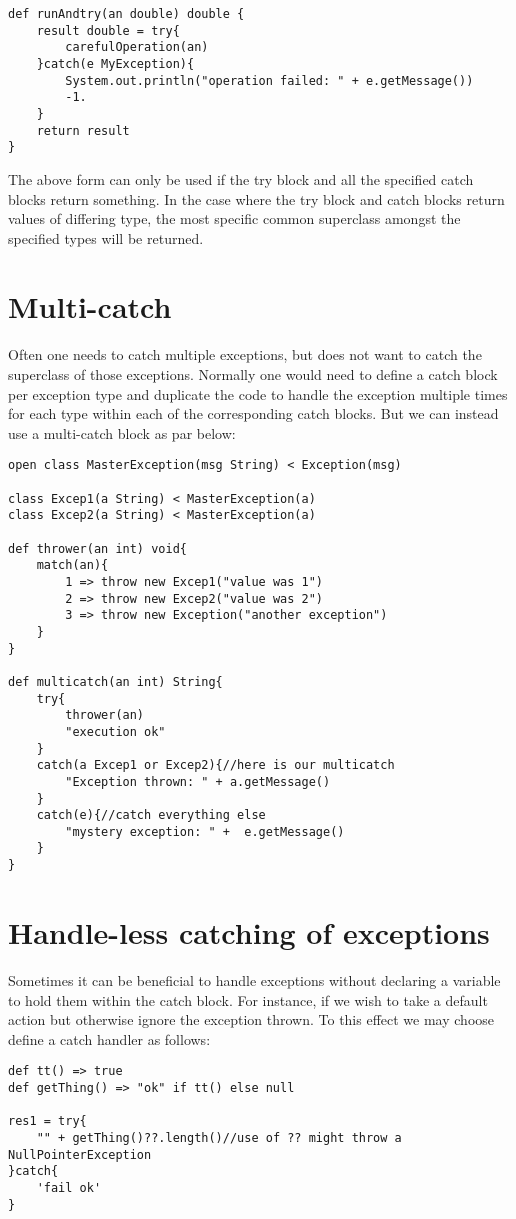 \documentclass[conc-doc]{subfiles}
\begin{document}
\begin{lstlisting}
def runAndtry(an double) double {
	result double = try{
		carefulOperation(an)
	}catch(e MyException){
		System.out.println("operation failed: " + e.getMessage())
		-1.
	}
	return result
}
\end{lstlisting}

The above form can only be used if the try block and all the specified catch blocks return something. In the case where the try block and catch blocks return values of differing type, the most specific common superclass amongst the specified types will be returned.

\section{Multi-catch}
Often one needs to catch multiple exceptions, but does not want to catch the superclass of those exceptions. Normally one would need to define a catch block per exception type and duplicate the code to handle the exception multiple times for each type within each of the corresponding catch blocks. But we can instead use a multi-catch block as par below:

\begin{lstlisting}
open class MasterException(msg String) < Exception(msg)

class Excep1(a String) < MasterException(a)
class Excep2(a String) < MasterException(a)

def thrower(an int) void{
	match(an){
		1 => throw new Excep1("value was 1")
		2 => throw new Excep2("value was 2")
		3 => throw new Exception("another exception")
	}
}

def multicatch(an int) String{
	try{
		thrower(an)
		"execution ok"
	}
	catch(a Excep1 or Excep2){//here is our multicatch
		"Exception thrown: " + a.getMessage()
	}
	catch(e){//catch everything else
		"mystery exception: " +  e.getMessage()
	}
}
\end{lstlisting}


\section{Handle-less catching of exceptions}
Sometimes it can be beneficial to handle exceptions without declaring a variable to hold them within the catch block. For instance, if we wish to take a default action but otherwise ignore the exception thrown. To this effect we may choose define a catch handler as follows:

\begin{lstlisting}
def tt() => true
def getThing() => "ok" if tt() else null

res1 = try{
	"" + getThing()??.length()//use of ?? might throw a NullPointerException
}catch{
	'fail ok'
}
\end{lstlisting}
 
\end{document}

